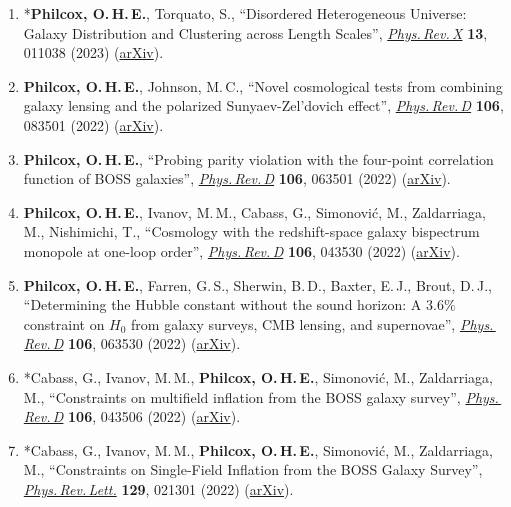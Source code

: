 \begin{enumerate}
    \item *\textbf{Philcox, O.\,H.\,E.}, Torquato, S., ``Disordered Heterogeneous Universe: Galaxy Distribution and Clustering across Length Scales'', \href{https://doi.org/10.1103/PhysRevX.13.011038}{\textit{Phys.\,Rev.\,X}} \textbf{13}, 011038 (2023) (\href{https://arxiv.org/abs/2207.00519}{arXiv}).
    \item \textbf{Philcox, O.\,H.\,E.}, Johnson, M.\,C., ``Novel cosmological tests from combining galaxy lensing and the polarized Sunyaev-Zel'dovich effect'', \href{https://doi.org/10.1103/PhysRevD.106.083501}{\textit{Phys.\,Rev.\,D}} \textbf{106}, 083501 (2022) (\href{https://arxiv.org/abs/2206.07054}{arXiv}).
    \item \textbf{Philcox, O.\,H.\,E.}, ``Probing parity violation with the four-point correlation function of BOSS galaxies'', \href{https://doi.org/10.1103/PhysRevD.106.063501}{\textit{Phys.\,Rev.\,D}} \textbf{106}, 063501 (2022) (\href{https://arxiv.org/abs/2206.04227}{arXiv}).
    \item \textbf{Philcox, O.\,H.\,E.}, Ivanov, M.\,M., Cabass, G., Simonovi\'c, M., Zaldarriaga, M., Nishimichi, T., ``Cosmology with the redshift-space galaxy bispectrum monopole at one-loop order'', \href{https://doi.org/10.1103/PhysRevD.106.043530}{\textit{Phys.\,Rev.\,D}} \textbf{106}, 043530 (2022) (\href{https://arxiv.org/abs/2206.02800}{arXiv}).
    \item \textbf{Philcox, O.\,H.\,E.}, Farren, G.\,S., Sherwin, B.\,D., Baxter, E.\,J., Brout, D.\,J., ``Determining the Hubble constant without the sound horizon: A $3.6\%$ constraint on $H_{0}$ from galaxy surveys, CMB lensing, and supernovae'', \href{https://doi.org/10.1103/PhysRevD.106.063530}{\textit{Phys.\,Rev.\,D}} \textbf{106}, 063530 (2022) (\href{https://arxiv.org/abs/2204.02984}{arXiv}).
    \item *Cabass, G., Ivanov, M.\,M., \textbf{Philcox, O.\,H.\,E.}, Simonovi\'c, M., Zaldarriaga, M., ``Constraints on multifield inflation from the BOSS galaxy survey'', \href{https://doi.org/10.1103/PhysRevD.106.043506}{\textit{Phys.\,Rev.\,D}} \textbf{106}, 043506 (2022) (\href{https://arxiv.org/abs/2204.01781}{arXiv}).
    \item *Cabass, G., Ivanov, M.\,M., \textbf{Philcox, O.\,H.\,E.}, Simonovi\'c, M., Zaldarriaga, M., ``Constraints on Single-Field Inflation from the BOSS Galaxy Survey'', \href{https://doi.org/10.1103/PhysRevLett.129.021301}{\textit{Phys.\,Rev.\,Lett.}} \textbf{129}, 021301 (2022) (\href{https://arxiv.org/abs/2201.07238}{arXiv}).

\end{enumerate}
